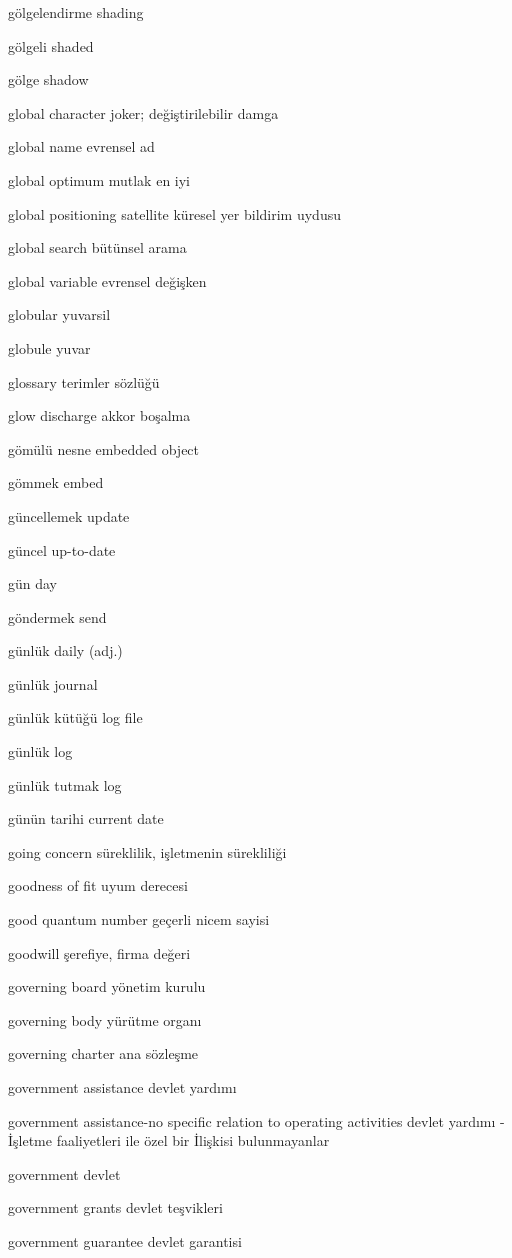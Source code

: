 \documentclass[12pt,fleqn]{article}\usepackage{../../common}
\begin{document}
gölgelendirme shading

gölgeli shaded

gölge shadow

global character joker; değiştirilebilir damga

global name evrensel ad

global optimum mutlak en iyi

global positioning satellite küresel yer bildirim uydusu

global search bütünsel arama

global variable evrensel değişken

globular yuvarsil

globule yuvar

glossary terimler sözlüğü

glow discharge akkor boşalma

gömülü nesne embedded object

gömmek embed

güncellemek update

güncel up-to-date

gün day

göndermek send

günlük daily (adj.)

günlük journal

günlük kütüğü log file

günlük log

günlük tutmak log

günün tarihi current date

going concern süreklilik, işletmenin sürekliliği

goodness of fit uyum derecesi

good quantum number geçerli nicem sayisi

goodwill şerefiye, firma değeri

governing board yönetim kurulu

governing body yürütme organı

governing charter ana sözleşme

government assistance devlet yardımı

government assistance-no specific relation to operating activities devlet yardımı - İşletme faaliyetleri ile özel bir İlişkisi bulunmayanlar

government devlet

government grants devlet teşvikleri

government guarantee devlet garantisi
\end{document}
